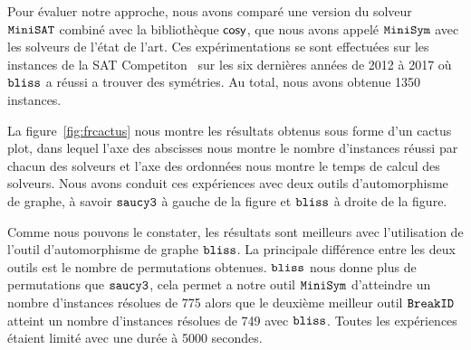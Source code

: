Pour évaluer notre approche, nous avons comparé une version du solveur $\texttt{MiniSAT}$ combiné avec la bibliothèque $\textsf{cosy}$, que nous avons appelé $\texttt{MiniSym}$ avec les solveurs de l'état de l'art.
Ces expérimentations se sont effectuées sur les instances de la SAT Competiton~\cite{jarvisalo2012international} sur les six dernières années de 2012 à 2017 où $\texttt{bliss}$ a réussi a trouver des symétries. Au total, nous avons obtenue 1350 instances.

La figure~\ref{fig:frcactus} nous montre les résultats obtenus sous forme d'un cactus plot, 
dans lequel l'axe des abscisses nous montre le nombre d'instances réussi par chacun des solveurs et l'axe des ordonnées nous montre le temps de calcul des solveurs.
Nous avons conduit ces expériences avec deux outils d'automorphisme de graphe, à savoir 
$\texttt{saucy3}$ à gauche de la figure et $\texttt{bliss}$ à droite de la figure. 

Comme nous pouvons le constater, les résultats sont meilleurs  avec l'utilisation de l'outil d'automorphisme de 
graphe $\texttt{bliss}$. La principale différence entre les deux outils est le nombre de permutations obtenues.
$\texttt{bliss}$ nous donne plus de permutations que $\texttt{saucy3}$, cela permet a notre outil $\texttt{MiniSym}$ d'atteindre 
un nombre d'instances résolues de 775 alors que le deuxième meilleur outil $\texttt{BreakID}$ atteint un nombre d'instances résolues de 749 avec $\texttt{bliss}$. Toutes les expériences étaient limité avec une durée à 5000 secondes.

